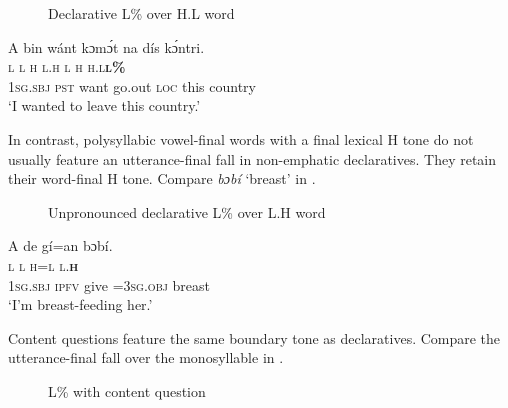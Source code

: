 \begin{figure}
\caption{Declarative L\% over H.L word}
\label{fig:key:3.27}
\end{figure}

 
\ea%
    \label{ex:key:80}
    \glll   A    bin  wánt  kɔmɔ́t  na  dís  kɔ́ntri.\\
\textsc{l}    \textsc{l}  \textsc{h}    \textsc{l.h}    \textsc{l}  \textsc{h}  \textsc{h.l}\textbf{\textsc{l\%}}\\
\textsc{1sg.sbj}  \textsc{pst}  want  go.out  \textsc{loc}  this  country\\
\glt ‘I wanted to leave this country.’
\z

In contrast, polysyllabic vowel-final words with a final lexical H tone do not usually feature an utterance-final fall in non-emphatic declaratives. They retain their word-final H tone. Compare \textit{bɔbí} ‘breast’ in .

\begin{figure}
\caption{Unpronounced declarative L\% over L.H word}
\label{fig:key:3.28}
\end{figure}
 


\ea%
    \label{ex:key:81}
    \glll   \MakeUppercase{A}   de    gí=an    bɔbí.\\
\textsc{l}    \textsc{l}    \textsc{h=l}      \textsc{l.}\textbf{\textsc{h}}\\
\textsc{1sg.sbj}  \textsc{ipfv}    give  =\textsc{3sg.obj}  breast\\
\glt ‘I’m breast-feeding her.’  
\z

Content questions feature the same boundary tone as declaratives. Compare the utterance-final fall over the monosyllable in .

\begin{figure}
\caption{L\% with content question}
\label{fig:key:3.29}
\end{figure}


